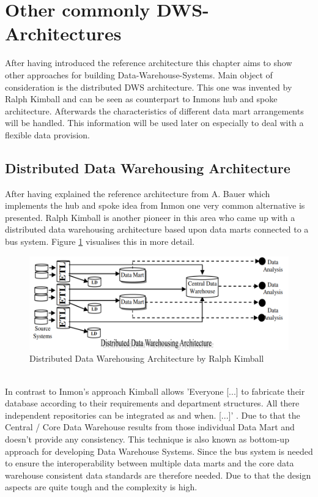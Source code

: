 \section{Other commonly DWS-Architectures}
\label{sec:otherArchitectures}
After having introduced the reference architecture this chapter aims to show other approaches for building Data-Warehouse-Systems. Main object of consideration is the distributed DWS architecture. This one was invented by Ralph Kimball and can be seen as counterpart to Inmons hub and spoke architecture.\newline
Afterwards the characteristics of different data mart arrangements will be handled. This information will be used later on especially to deal with a flexible data provision. 

\subsection{Distributed Data Warehousing Architecture}
After having explained the reference architecture from A. Bauer which implements the hub and spoke idea from Inmon one very common alternative is presented. Ralph Kimball is another pioneer in this area who came up with a distributed data warehousing architecture based upon data marts connected to a bus system. \cite{surveyDWSArchs} Figure \ref{fig:distributedWarehouseArchitecture} visualises this in more detail.
\begin{figure}[htb]
    \centering
    \includegraphics[scale=0.5]{pictures/DistributedDataWarehouseArchitecture.PNG}
    \caption{Distributed Data Warehousing Architecture by Ralph Kimball \cite{surveyDWSArchs}}
    \label{fig:distributedWarehouseArchitecture}
\end{figure}
\\In contrast to Inmon's approach Kimball allows 'Everyone [...] to fabricate their database according to their requirements and department structures. All there independent repositories can be integrated as and when. [...]' \cite{surveyDWSArchs}. Due to that the Central / Core Data Warehouse results from those individual Data Mart and doesn't provide any consistency. This technique is also known as bottom-up approach for developing Data Warehouse Systems. Since the bus system is needed to ensure the interoperability between multiple data marts and the core data warehouse consistent data standards are therefore needed. Due to that the design aspects are quite tough and the complexity is high. \cite{KimbalVSInmon}\newline
